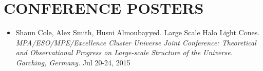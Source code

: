 \section{CONFERENCE POSTERS}
\begin{itemize}

\item Shaun Cole, Alex Smith, Husni Almoubayyed. Large Scale Halo Light Cones. {\sl MPA/ESO/MPE/Excellence Cluster Universe Joint Conference: Theoretical and Observational Progress on Large-scale Structure of the Universe. Garching, Germany.} \hfill  Jul 20-24, 2015
\end{itemize}